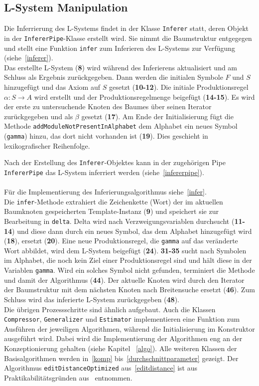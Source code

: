 \subsection*{L-System Manipulation}
Die Inferrierung des L-Systems findet in der Klasse \texttt{Inferer} statt, deren Objekt in der \texttt{InfererPipe}-Klasse erstellt wird.
Sie nimmt die Baumstruktur entgegegen und stellt eine Funktion \texttt{infer} zum Inferieren des L-Systems zur Verfügung (siehe~\ref{inferer}).\\
Das erstellte L-System (\textbf{8}) wird während des Inferierens aktualisiert und am Schluss als Ergebnis zurückgegeben.
Dann werden die initialen Symbole $F$ und $S$ hinzugefügt und das Axiom auf $S$ gesetzt (\textbf{10-12}).
Die initiale Produktionsregel $\alpha: S \rightarrow A$ wird erstellt und der Produktionsregelmenge beigefügt (\textbf{14-15}).
Es wird der erste zu untersuchende Knoten des Baumes über seinen Iterator zurückgegeben und als $\beta$ gesetzt (\textbf{17}).
Am Ende der Initialisierung fügt die Methode \texttt{addModuleNotPresentInAlphabet} dem Alphabet ein neues Symbol (\texttt{gamma}) hinzu,
das dort nicht vorhanden ist (\textbf{19}).
Dies geschieht in lexikografischer Reihenfolge.

Nach der Erstellung des \texttt{Inferer}-Objektes kann in der zugehörigen Pipe \texttt{InfererPipe} das L-System inferriert
werden (siehe~\ref{infererpipe}).\\~\\
Für die Implementierung des Inferierungsalgorithmus siehe~\ref{infer}.\\
Die \texttt{infer}-Methode extrahiert die Zeichenkette (Wort) der im aktuellen Baumknoten gespeicherten Template-Instanz
(\textbf{9}) und speichert sie zur Bearbeitung in \texttt{delta}.
Delta wird nach Verzweigungsvariablen durchsucht (\textbf{11-14}) und diese dann durch ein neues Symbol,
das dem Alphabet hinzugefügt wird (\textbf{18}), ersetzt (\textbf{20}).
Eine neue Produktionsregel, die \texttt{gamma} auf das veränderte Wort abbildet, wird dem L-System beigefügt (\textbf{24}).
\textbf{31-35} sucht nach Symbolen im Alphabet, die noch kein Ziel einer Produktionsregel sind und hält diese in der
Variablen \texttt{gamma}.
Wird ein solches Symbol nicht gefunden, terminiert die Methode und damit der Algorithmus (\textbf{44}).
Der aktuelle Knoten wird durch den Iterator der Baumstruktur mit dem nächsten Knoten nach Breitensuche ersetzt (\textbf{46}).
Zum Schluss wird das inferierte L-System zurückgegeben (\textbf{48}).\\

Die übrigen Prozessschritte sind ähnlich aufgebaut.
Auch die Klassen \texttt{Compressor}, \texttt{Generalizer} und \texttt{Estimator} implementieren eine Funktion zum Ausführen
der jeweiligen Algorithmen, während die Initialisierung im Konstruktor ausgeführt wird.
Dabei wird die Implementierung der Algorithmen eng an der Konzeptionierung gehalten (siehe Kapitel ~\ref{algo}).
Alle weiteren Klassen der Basisalgorithmen werden in~\ref{komp} bis~\ref{durchschnittparameter} gezeigt.
Der Algorithmus \texttt{editDistanceOptimized} aus~\ref{editdistance} ist aus Praktikabilitätsgründen aus~\cite{editdistance}
entnommen.
